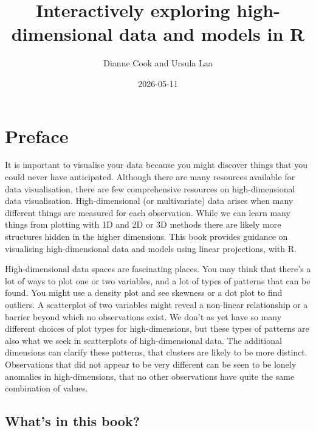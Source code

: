 \documentclass[
  letterpaper,
]{krantz}
\title{Interactively exploring high-dimensional data and models in R}
\author{Dianne Cook and Ursula Laa}
\date{2026-05-11}
\renewcommand*\contentsname{Table of contents}
\newcommand\contentsname{Table of contents}
\begin{document}
\maketitle

\renewcommand*\contentsname{Contents}
{
\setcounter{tocdepth}{2}
\tableofcontents
}


\chapter*{Preface}\label{preface}


It is important to visualise your data because you might discover things
that you could never have anticipated. Although there are many resources
available for data visualisation, there are few comprehensive resources
on high-dimensional data visualisation. High-dimensional (or
multivariate) data arises when many different things are measured for
each observation. While we can learn many things from plotting with 1D
and 2D or 3D methods there are likely more structures hidden in the
higher dimensions. This book provides guidance on visualising
high-dimensional data and models using linear projections, with R.

High-dimensional data spaces are fascinating places. You may think that
there's a lot of ways to plot one or two variables, and a lot of types
of patterns that can be found. You might use a density plot and see
skewness or a dot plot to find outliers. A scatterplot of two variables
might reveal a non-linear relationship or a barrier beyond which no
observations exist. We don't as yet have so many different choices of
plot types for high-dimensions, but these types of patterns are also
what we seek in scatterplots of high-dimensional data. The additional
dimensions can clarify these patterns, that clusters are likely to be
more distinct. Observations that did not appear to be very different can
be seen to be lonely anomalies in high-dimensions, that no other
observations have quite the same combination of values.

\section*{What's in this book?}\label{whats-in-this-book}

\end{document}
